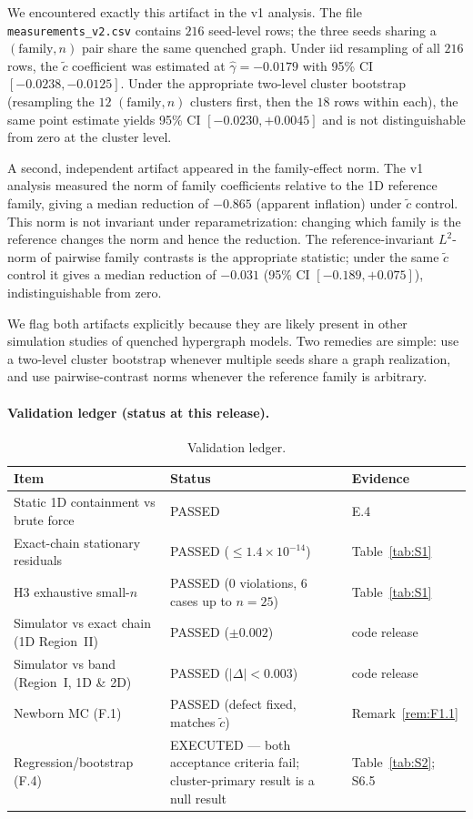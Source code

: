 \documentclass[preprint,12pt]{elsarticle}
\newcommand{\ctil}{\tilde{c}}
\begin{document}
We encountered exactly this artifact in the v1 analysis. The file
\texttt{measurements\_v2.csv} contains \(216\) seed-level rows; the
three seeds sharing a \((\text{family},n)\) pair share the same quenched
graph. Under iid resampling of all \(216\) rows, the \(\tilde c\)
coefficient was estimated at \(\hat\gamma=-0.0179\) with 95\% CI
\([-0.0238,-0.0125]\). Under the appropriate two-level cluster
bootstrap (resampling the \(12\) \((\text{family},n)\) clusters first,
then the \(18\) rows within each), the same point estimate yields 95\%
CI \([-0.0230,+0.0045]\) and is not distinguishable from zero at the
cluster level.

A second, independent artifact appeared in the family-effect norm. The
v1 analysis measured the norm of family coefficients relative to the 1D
reference family, giving a median reduction of \(-0.865\) (apparent
inflation) under \(\tilde c\) control. This norm is not invariant under
reparametrization: changing which family is the reference changes the
norm and hence the reduction. The reference-invariant \(L^2\)-norm of
pairwise family contrasts is the appropriate statistic; under the same
\(\tilde c\) control it gives a median reduction of \(-0.031\) (95\% CI
\([-0.189,+0.075]\)), indistinguishable from zero.

We flag both artifacts explicitly because they are likely present in
other simulation studies of quenched hypergraph models. Two remedies
are simple: use a two-level cluster bootstrap whenever multiple seeds
share a graph realization, and use pairwise-contrast norms whenever the
reference family is arbitrary.

\paragraph{Validation ledger (status at this release).}
\begin{table}[t]
\caption{\label{tab:ledger}
Validation ledger.}
\centering
\begin{tabular}{p{4.8cm}p{4.2cm}p{2.3cm}}
\hline\hline
Item & Status & Evidence \\
\hline
Static 1D containment vs brute force & PASSED & E.4 \\
Exact-chain stationary residuals & PASSED ($\le1.4\times10^{-14}$) & Table~\ref{tab:S1} \\
H3 exhaustive small-$n$ & PASSED (0 violations, 6 cases up to $n=25$) & Table~\ref{tab:S1} \\
Simulator vs exact chain (1D Region~II) & PASSED ($\pm0.002$) & code release \\
Simulator vs band (Region~I, 1D \& 2D) & PASSED ($|\Delta|<0.003$) & code release \\
Newborn MC (F.1) & PASSED (defect fixed, matches $\ctil$) & Remark~\ref{rem:F1.1} \\
Regression/bootstrap (F.4) & EXECUTED --- both acceptance criteria fail; cluster-primary result is a null result & Table~\ref{tab:S2}; S6.5 \\
\hline\hline
\end{tabular}
\end{table}
\end{document}
